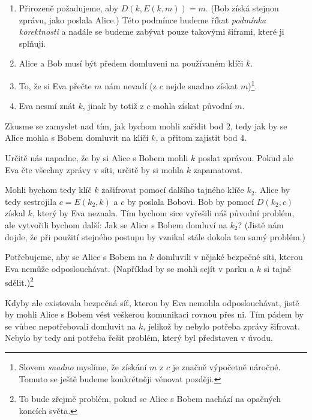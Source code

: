 \documentclass[12pt]{article}
\begin{document}
    \begin{enumerate}
        \item
            Přirozeně požadujeme, aby $D(k, E(k, m))=m$.
            (Bob získá stejnou zprávu, jako poslala Alice.)
            Této podmínce budeme říkat \emph{podmínka korektnosti} a nadále se budeme
            zabývat pouze takovými šiframi, které ji splňují.
        \item
            Alice a Bob musí být předem domluveni na používaném klíči $k$.
        \item
            To, že si Eva přečte $m$ nám nevadí (z $c$ nejde snadno získat $m$)\footnote{Slovem \emph{snadno} myslíme, že získání
            $m$ z $c$ je značně výpočetně náročné. Tomuto se ještě budeme konkrétněji věnovat později.}.
        \item
            Eva nesmí znát $k$, jinak by totiž z $c$ mohla získat původní $m$.
    \end{enumerate}

    Zkusme se zamyslet nad tím, jak bychom mohli zařídit bod 2, tedy jak by se Alice mohla s Bobem
    domluvit na klíči $k$, a přitom zajistit bod 4.

    \medskip

    Určitě nás napadne, že by si Alice s Bobem mohli $k$ poslat zprávou.
    Pokud ale Eva čte všechny zprávy v síti, určitě by si mohla $k$ zapamatovat.

    Mohli bychom tedy klíč $k$ zašifrovat pomocí dalšího tajného klíče $k_2$.
    Alice by tedy sestrojila $c = E(k_2, k)$ a $c$ by poslala Bobovi.
    Bob by pomocí $D(k_2, c)$ získal $k$, který by Eva neznala.
    Tím bychom sice vyřešili náš původní problém, ale vytvořili bychom další: Jak se Alice s Bobem domluví
    na $k_2$? (Jistě nám dojde, že při použití stejného postupu by vznikal stále dokola ten samý problém.)
    
    Potřebujeme, aby se Alice s Bobem na $k$ domluvili v nějaké bezpečné síti, kterou Eva nemůže odposlouchávat.
    (Například by se mohli sejít v parku a $k$ si tajně sdělit.)\footnote{To bude zřejmě problém, pokud se Alice s Bobem
    nachází na opačných koncích světa.}

    Kdyby ale existovala bezpečná síť, kterou by Eva nemohla
    odposlouchávat, jistě by mohli Alice s Bobem vést veškerou komunikaci rovnou přes ni.
    Tím pádem by se vůbec nepotřebovali domluvit na $k$, jelikož
    by nebylo potřeba zprávy šifrovat. Nebylo by tedy ani potřeba řešit problém, který byl představen v úvodu.
\end{document}

